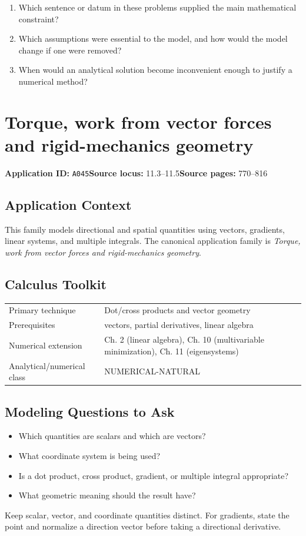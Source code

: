 \documentclass[11pt]{book}
\newcommand{\pid}[1]{\texttt{#1}}
\begin{document}
\begin{reflectionbox}\begin{enumerate}
\item Which sentence or datum in these problems supplied the main mathematical constraint?
\item Which assumptions were essential to the model, and how would the model change if one were removed?
\item When would an analytical solution become inconvenient enough to justify a numerical method?
\end{enumerate}\end{reflectionbox}
\chapter{Torque, work from vector forces and rigid-mechanics geometry}\label{app:A045}
\textbf{Application ID:} \pid{A045}\quad \textbf{Source locus:} 11.3–11.5\quad \textbf{Source pages:} 770–816
\section*{Application Context}
This family models directional and spatial quantities using vectors, gradients, linear systems, and multiple integrals. The canonical application family is \emph{Torque, work from vector forces and rigid-mechanics geometry}.
\section*{Calculus Toolkit}
\begin{tabularx}{\textwidth}{@{}lX@{}}\toprule
Primary technique & Dot/cross products and vector geometry \\
Prerequisites & vectors, partial derivatives, linear algebra \\
Numerical extension & Ch. 2 (linear algebra), Ch. 10 (multivariable minimization), Ch. 11 (eigensystems) \\
Analytical/numerical class & NUMERICAL-NATURAL \\
\bottomrule\end{tabularx}
\section*{Modeling Questions to Ask}\begin{itemize}
\item Which quantities are scalars and which are vectors?
\item What coordinate system is being used?
\item Is a dot product, cross product, gradient, or multiple integral appropriate?
\item What geometric meaning should the result have?
\end{itemize}
\begin{errorbox}Keep scalar, vector, and coordinate quantities distinct. For gradients, state the point and normalize a direction vector before taking a directional derivative.\end{errorbox}
\end{document}

